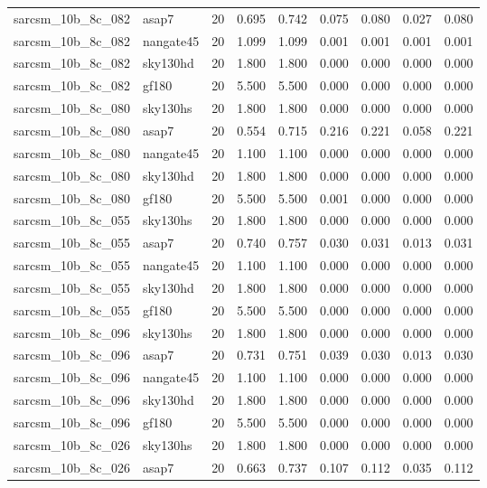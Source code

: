 \begin{tabular}{llrrrrrrr}
sarcsm\_10b\_8c\_082 & asap7 & 20 & 0.695 & 0.742 & 0.075 & 0.080 & 0.027 & 0.080 \\
sarcsm\_10b\_8c\_082 & nangate45 & 20 & 1.099 & 1.099 & 0.001 & 0.001 & 0.001 & 0.001 \\
sarcsm\_10b\_8c\_082 & sky130hd & 20 & 1.800 & 1.800 & 0.000 & 0.000 & 0.000 & 0.000 \\
sarcsm\_10b\_8c\_082 & gf180 & 20 & 5.500 & 5.500 & 0.000 & 0.000 & 0.000 & 0.000 \\
sarcsm\_10b\_8c\_080 & sky130hs & 20 & 1.800 & 1.800 & 0.000 & 0.000 & 0.000 & 0.000 \\
sarcsm\_10b\_8c\_080 & asap7 & 20 & 0.554 & 0.715 & 0.216 & 0.221 & 0.058 & 0.221 \\
sarcsm\_10b\_8c\_080 & nangate45 & 20 & 1.100 & 1.100 & 0.000 & 0.000 & 0.000 & 0.000 \\
sarcsm\_10b\_8c\_080 & sky130hd & 20 & 1.800 & 1.800 & 0.000 & 0.000 & 0.000 & 0.000 \\
sarcsm\_10b\_8c\_080 & gf180 & 20 & 5.500 & 5.500 & 0.001 & 0.000 & 0.000 & 0.000 \\
sarcsm\_10b\_8c\_055 & sky130hs & 20 & 1.800 & 1.800 & 0.000 & 0.000 & 0.000 & 0.000 \\
sarcsm\_10b\_8c\_055 & asap7 & 20 & 0.740 & 0.757 & 0.030 & 0.031 & 0.013 & 0.031 \\
sarcsm\_10b\_8c\_055 & nangate45 & 20 & 1.100 & 1.100 & 0.000 & 0.000 & 0.000 & 0.000 \\
sarcsm\_10b\_8c\_055 & sky130hd & 20 & 1.800 & 1.800 & 0.000 & 0.000 & 0.000 & 0.000 \\
sarcsm\_10b\_8c\_055 & gf180 & 20 & 5.500 & 5.500 & 0.000 & 0.000 & 0.000 & 0.000 \\
sarcsm\_10b\_8c\_096 & sky130hs & 20 & 1.800 & 1.800 & 0.000 & 0.000 & 0.000 & 0.000 \\
sarcsm\_10b\_8c\_096 & asap7 & 20 & 0.731 & 0.751 & 0.039 & 0.030 & 0.013 & 0.030 \\
sarcsm\_10b\_8c\_096 & nangate45 & 20 & 1.100 & 1.100 & 0.000 & 0.000 & 0.000 & 0.000 \\
sarcsm\_10b\_8c\_096 & sky130hd & 20 & 1.800 & 1.800 & 0.000 & 0.000 & 0.000 & 0.000 \\
sarcsm\_10b\_8c\_096 & gf180 & 20 & 5.500 & 5.500 & 0.000 & 0.000 & 0.000 & 0.000 \\
sarcsm\_10b\_8c\_026 & sky130hs & 20 & 1.800 & 1.800 & 0.000 & 0.000 & 0.000 & 0.000 \\
sarcsm\_10b\_8c\_026 & asap7 & 20 & 0.663 & 0.737 & 0.107 & 0.112 & 0.035 & 0.112 \\

\end{tabular}
